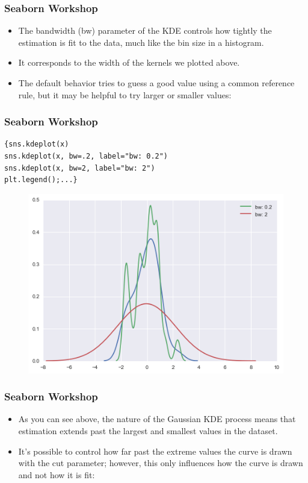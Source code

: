 \documentclass{beamer}
\begin{document}
\begin{frame}[fragile]
	\frametitle{Seaborn Workshop}
	\large
\begin{itemize}
\item The bandwidth (bw) parameter of the KDE controls how tightly the estimation is fit to the data, much like the bin size in a histogram. 
\item It corresponds to the width of the kernels we plotted above. \item The default behavior tries to guess a good value using a common reference rule, but it may be helpful to try larger or smaller values:
\end{itemize}


\end{frame}
\begin{frame}[fragile]
	\frametitle{Seaborn Workshop}
	\large
\begin{verbatim}
{sns.kdeplot(x)
sns.kdeplot(x, bw=.2, label="bw: 0.2")
sns.kdeplot(x, bw=2, label="bw: 2")
plt.legend();...}
\end{verbatim}

\begin{figure}
\centering
\includegraphics[width=0.7\linewidth]{images/distributions_22_0}
\end{figure}

\end{frame}
\begin{frame}[fragile]
		\frametitle{Seaborn Workshop}
	\large
\begin{itemize}
\item As you can see above, the nature of the Gaussian KDE process means that estimation extends past the largest and smallest values in the dataset. 
\item It’s possible to control how far past the extreme values the curve is drawn with the cut parameter; however, this only influences how the curve is drawn and not how it is fit:
\end{itemize}
\end{frame}
\end{document}
